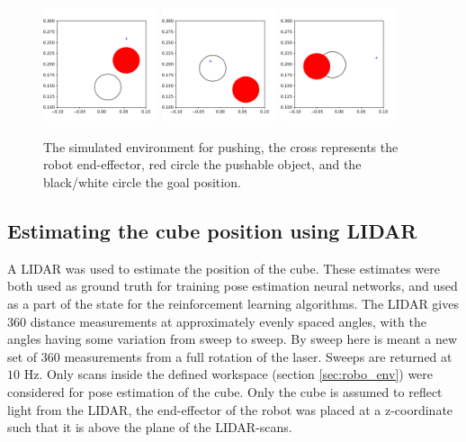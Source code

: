 \begin{figure}[!ht]
    \centering
    \includegraphics[width=0.3\textwidth]{res/env_sim1.pdf}
    \includegraphics[width=0.3\textwidth]{res/env_sim2.pdf}
    \includegraphics[width=0.3\textwidth]{res/env_sim3.pdf}

    \caption{The simulated environment for pushing, the cross represents the
    robot end-effector, red circle the pushable object, and the black/white
    circle the goal position.}

    \label{fig:env_sim_samples}
\end{figure}

\subsection{Estimating the cube position using LIDAR}

A LIDAR was used to estimate the position of the cube. These estimates were
both used as ground truth for training pose estimation neural networks, and
used as a part of the state for the reinforcement learning algorithms. The
LIDAR gives $360$ distance measurements at approximately evenly spaced angles,
with the angles having some variation from sweep to sweep. By sweep here is
meant a new set of 360 measurements from a full rotation of the laser. Sweeps
are returned at $10$ Hz. Only scans inside the defined workspace (section
\ref{sec:robo_env}) were considered for pose estimation of the cube. Only the
cube is assumed to reflect light from the LIDAR, the end-effector of the robot
was placed at a z-coordinate such that it is above the plane of the
LIDAR-scans.

